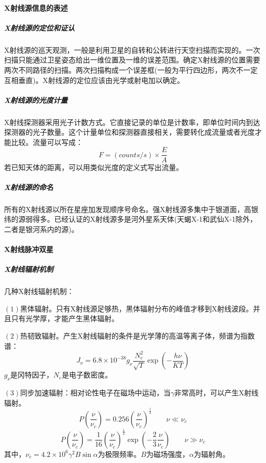 \paragraph{X射线源信息的表述}
\subparagraph{X射线源的定位和证认}X射线源的巡天观测，一般是利用卫星的自转和公转进行天空扫描而实现的。一次扫描只能通过卫星姿态给出一维位置及一维的误差范围。确定X射线源的位置需要两次不同路径的扫描。两次扫描构成一个误差框(一般为平行四边形，两次不一定互相垂直)。X射线源的定位应该由光学或射电加以确定。
\subparagraph{X射线源的光度计量}X射线探测器采用光子计数方式。它直接记录的单位是计数率，即单位时间内到达探测器的光子数量。这个计量单位和探测器直接相关，需要转化成流量或者光度才能比较。流量可以写成：
\begin{equation*}
	F=(counts/s)\times \frac{E}{A}
\end{equation*}
若已知天体的距离，可以用类似光度的定义式写出流量。
\subparagraph{X射线源的命名}所有的X射线源以所在星座加发现顺序号命名。强X射线源多集中于银道面，高银纬的源弱得多。已经认证的X射线源多是河外星系天体(天蝎X-1和武仙X-1除外，二者是银河系内的源)。
\paragraph{X射线脉冲双星}

\subparagraph{X射线辐射机制}
几种X射线辐射机制：

$\left(1\right)$黑体辐射。只有X射线源足够热，黑体辐射分布的峰值才移到X射线波段。并且只有光学厚，才能产生黑体辐射。

$\left(2\right)$热韧致辐射。产生X射线辐射的条件是光学薄的高温等离子体，频谱为指数谱：
\begin{equation}
	J_{\nu}=6.8\times 10^{-38}g_{\nu}\frac{N_{e}^2}{\sqrt{T}}\exp\left(-\frac{h\nu}{KT}\right)
\end{equation}
$g_{\nu}$是冈特因子，$N_{e}$是电子数密度。

$\left(3\right)$同步加速辐射：相对论性电子在磁场中运动，当$\gamma$非常高时，可以产生X射线辐射。
\begin{equation}
		P\left(\frac{\nu}{\nu_{c}}\right)=0.256\left(\frac{\nu}{\nu_{c}}\right)^{\frac{1}{3}}\qquad \nu\ll \nu_{c}
\end{equation}
\begin{equation}
	P\left(\frac{\nu}{\nu_{c}}\right)=\frac{1}{16}\left(\frac{\nu}{\nu_{c}}\right)^{\frac{1}{2}}\exp\left(-\frac{2}{3}\frac{\nu}{\nu_{c}}\right)\qquad \nu\gg \nu_{c}
\end{equation}
其中，$\nu_{c}=4.2\times 10^6\gamma^2B\sin \alpha$为极限频率。$B$为磁场强度，$\alpha$为辐射角。


